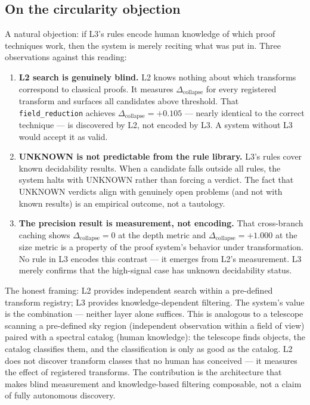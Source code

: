 \documentclass[11pt,a4paper]{article}
\newcommand{\Dcollapse}{\Delta_{\mathrm{collapse}}}
\begin{document}
\subsection{On the circularity objection}
\label{sec:circularity}

A natural objection: if L3's rules encode human knowledge of which proof techniques work, then the system is merely reciting what was put in. Three observations against this reading:

\begin{enumerate}[nosep]
    \item \textbf{L2 search is genuinely blind.} L2 knows nothing about which transforms correspond to classical proofs. It measures $\Dcollapse$ for every registered transform and surfaces all candidates above threshold. That \texttt{field\_reduction} achieves $\Dcollapse = +0.105$ --- nearly identical to the correct technique --- is discovered by L2, not encoded by L3. A system without L3 would accept it as valid.
    \item \textbf{UNKNOWN is not predictable from the rule library.} L3's rules cover known decidability results. When a candidate falls outside all rules, the system halts with UNKNOWN rather than forcing a verdict. The fact that UNKNOWN verdicts align with genuinely open problems (and not with known results) is an empirical outcome, not a tautology.
    \item \textbf{The precision result is measurement, not encoding.} That cross-branch caching shows $\Dcollapse = 0$ at the depth metric and $\Dcollapse = +1.000$ at the size metric is a property of the proof system's behavior under transformation. No rule in L3 encodes this contrast --- it emerges from L2's measurement. L3 merely confirms that the high-signal case has unknown decidability status.
\end{enumerate}

The honest framing: L2 provides independent search within a pre-defined transform registry; L3 provides knowledge-dependent filtering. The system's value is the combination --- neither layer alone suffices. This is analogous to a telescope scanning a pre-defined sky region (independent observation within a field of view) paired with a spectral catalog (human knowledge): the telescope finds objects, the catalog classifies them, and the classification is only as good as the catalog. L2 does not discover transform classes that no human has conceived --- it measures the effect of registered transforms. The contribution is the architecture that makes blind measurement and knowledge-based filtering composable, not a claim of fully autonomous discovery.
\end{document}
